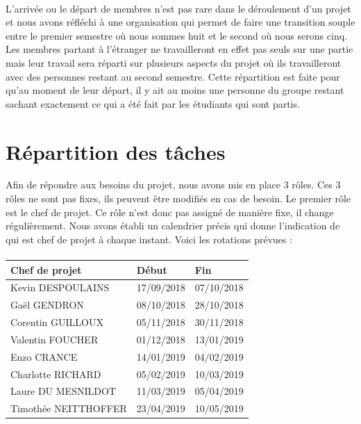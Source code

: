 \paragraph{}
L’arrivée ou le départ de membres n’est pas rare dans le déroulement d’un projet et nous avons
réfléchi à une organisation qui permet de faire une transition souple entre le premier semestre
où nous sommes huit et le second où nous serons cinq. Les membres partant à l’étranger ne
travailleront en effet pas seuls sur une partie mais leur travail sera réparti sur plusieurs
aspects du projet où ils travailleront avec des personnes restant au second semestre. Cette
répartition est faite pour qu’au moment de leur départ, il y ait au moins une personne du groupe
restant sachant exactement ce qui a été fait par les étudiants qui sont partis.

\section{Répartition des tâches}

Afin de répondre aux besoins du projet, nous avons mis en place 3 rôles. Ces 3 rôles ne sont pas fixes,
ils peuvent être modifiés en cas de besoin. Le premier rôle est le chef de projet. Ce rôle n’est donc pas
assigné de manière fixe, il change régulièrement. Nous avons établi un calendrier précis qui donne l’indication
de qui est chef de projet à chaque instant. Voici les rotations prévues :

\paragraph{}
\begin{center}
\begin{tabular}{ | l | l | l | }
\hline
{\textbf{Chef de projet}}   &   {\textbf{Début}}    &   {\textbf{Fin}}  \\ \hline \rowcolor[RGB]{182, 215, 168}
{Kevin DESPOULAINS}         &   {17/09/2018}        &	{07/10/2018}    \\ \hline \rowcolor[RGB]{255, 229, 153}
{Gaël GENDRON}              &   {08/10/2018}	    &	{28/10/2018}    \\ \hline \rowcolor[RGB]{249, 203, 156}
{Corentin GUILLOUX}         &   {05/11/2018}	    &	{30/11/2018}    \\ \hline \rowcolor[RGB]{234, 153, 153}
{Valentin FOUCHER}          &   {01/12/2018}	    &	{13/01/2019}    \\ \hline \rowcolor[RGB]{221, 126, 107}
{Enzo CRANCE}               &   {14/01/2019}	    &	{04/02/2019}    \\ \hline \rowcolor[RGB]{213, 166, 189}
{Charlotte RICHARD}         &   {05/02/2019}	    &	{10/03/2019}    \\ \hline \rowcolor[RGB]{180, 167, 214}
{Laure DU MESNILDOT}        &   {11/03/2019}	    &	{05/04/2019}    \\ \hline \rowcolor[RGB]{159, 197, 232}
{Timothée NEITTHOFFER}      &	{23/04/2019}	    &	{10/05/2019}    \\ \hline
\end{tabular}
\end{center}

